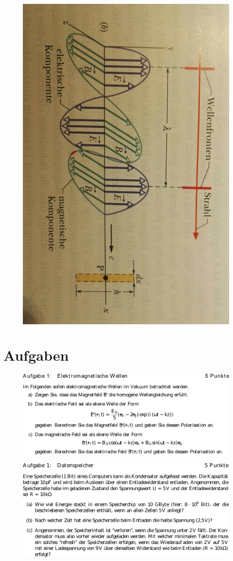 \begin{figure}
    \centering
    \includegraphics[width=.8\textwidth]{media/em_wellen.pdf}
    \label{fig:em_wellen}
   \end{figure}
\pagebreak
\section{Aufgaben}
\begin{figure}
    \centering
    \includegraphics{media/aufgabe_1.pdf}
    \label{fig:aufgabe_1}
   \end{figure}
   \begin{figure}
    \centering
    \includegraphics{media/aufgabe_3.pdf}
    \label{fig:aufgabe_3}
   \end{figure}